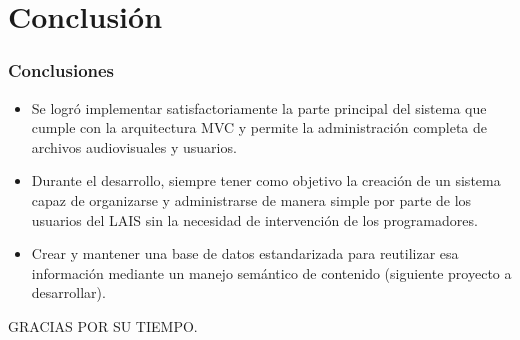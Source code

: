 \documentclass{beamer}
\begin{document}
\section{Conclusión}
\begin{frame}
	\frametitle{Conclusiones}
	\begin{itemize}
		\item Se logró implementar satisfactoriamente la parte principal del sistema que cumple con la arquitectura MVC y permite la administración completa de archivos audiovisuales y usuarios.
		\item Durante el desarrollo, siempre tener como objetivo la creación de un sistema capaz de organizarse y administrarse de manera simple por parte de los usuarios del LAIS sin la necesidad de intervención de los programadores.
		\item Crear y mantener una base de datos estandarizada para reutilizar esa información mediante un manejo semántico de contenido (siguiente proyecto a desarrollar).
	\end{itemize}
\end{frame}

\begin{frame}
	\begin{center}
		GRACIAS POR SU TIEMPO.
		
	\end{center}
\end{frame}
\end{document}
